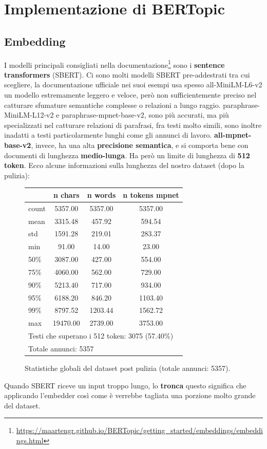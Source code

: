 \chapter{Implementazione di BERTopic}

\section{Embedding}
I modelli principali consigliati nella documentazione\footnote{\url{https://maartengr.github.io/BERTopic/getting_started/embeddings/embeddings.html}} sono i \textbf{sentence transformers} (SBERT).
Ci sono molti modelli SBERT pre-addestrati tra cui scegliere, la documentazione ufficiale nei suoi esempi usa spesso all-MiniLM-L6-v2 un modello estremamente leggero e veloce, però non sufficientemente preciso nel catturare sfumature semantiche complesse o relazioni a lungo raggio.
paraphrase-MiniLM-L12-v2 e paraphrase-mpnet-base-v2, sono più accurati, ma più specializzati nel catturare relazioni di parafrasi, fra testi molto simili, sono inoltre inadatti a testi particolarmente lunghi come gli annunci di lavoro.
\textbf{all-mpnet-base-v2}, invece, ha una alta \textbf{precisione semantica}, e si comporta bene con documenti di lunghezza \textbf{medio-lunga}.
Ha però un limite di lunghezza di \textbf{512 token}.
Ecco alcune informazioni sulla lunghezza del nostro dataset (dopo la pulizia):
\begin{figure}[H]
\centering
\scriptsize
\begin{tabular}{lccc}
\hline
 & n chars & n words & n tokens mpnet \\
\hline
count & 5357.00 & 5357.00 & 5357.00 \\
mean & 3315.48 & 457.92 & 594.54 \\
std & 1591.28 & 219.01 & 283.37 \\
min & 91.00 & 14.00 & 23.00 \\
50\% & 3087.00 & 427.00 & 554.00 \\
75\% & 4060.00 & 562.00 & 729.00 \\
90\% & 5213.40 & 717.00 & 934.00 \\
95\% & 6188.20 & 846.20 & 1103.40 \\
99\% & 8797.52 & 1203.44 & 1562.72 \\
max & 19470.00 & 2739.00 & 3753.00 \\
\hline
\multicolumn{4}{l}{Testi che superano i 512 token: 3075 (57.40\%)} \\
\multicolumn{4}{l}{Totale annunci: 5357} \\
\hline
\end{tabular}
\caption{Statistiche globali del dataset post pulizia (totale annunci: 5357).}
\label{fig:dataset-stats}
\end{figure}
\noindent Quando SBERT riceve un input troppo lungo, lo \textbf{tronca} questo significa che applicando l'embedder così come è verrebbe tagliata una porzione molto grande del dataset.

